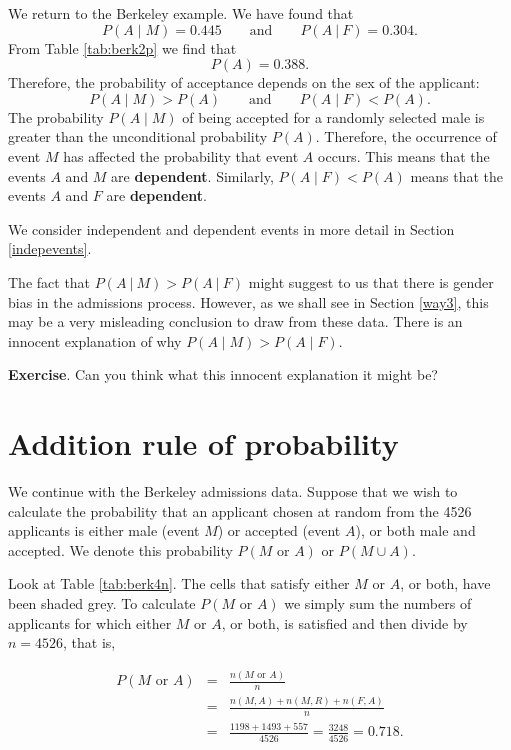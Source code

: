 \documentclass[
  british,
]{book}
\begin{document}
We return to the Berkeley example. We have found that
\[ P(A \mid M) = 0.445 \qquad \mbox{and} \qquad P(A~|~F) = 0.304. \]
From Table \ref{tab:berk2p} we find that
\[ P(A) = 0.388. \]
Therefore, the probability of acceptance depends on the sex of the applicant:
\[ P(A \mid M) > P(A) \qquad \mbox{and} \qquad P(A \mid F) < P(A). \]
The probability \(P(A \mid M)\) of being accepted for a randomly selected male is greater than the unconditional probability \(P(A)\). Therefore, the occurrence of event \(M\) has affected the probability that event \(A\) occurs. This means that the events \(A\) and \(M\) are \textbf{dependent}. Similarly, \(P(A \mid F) < P(A)\) means that the events \(A\) and \(F\) are \textbf{dependent}.

We consider independent and dependent events in more detail in Section \ref{indepevents}.

The fact that \(P(A~|~M) > P(A~|~F)\) might suggest to us that there is gender bias in the admissions process. However, as we shall see in Section \ref{way3}, this may be a very misleading conclusion to draw from these data. There is an innocent explanation of why \(P(A \mid M) > P(A \mid F)\).

\textbf{Exercise}. Can you think what this innocent explanation it might be?

\hypertarget{addition-rule-of-probability}{%
\section{Addition rule of probability}\label{addition-rule-of-probability}}

We continue with the Berkeley admissions data. Suppose that we wish to calculate the probability that an applicant chosen at random from the 4526 applicants is either male (event \(M\)) or accepted (event \(A\)), or both male and accepted. We denote this probability \(P(M \mbox{ or } A)\) or \(P(M \cup A)\).

Look at Table \ref{tab:berk4n}. The cells that satisfy either \(M\) or \(A\), or both, have been shaded grey. To calculate \(P(M \mbox{ or } A)\) we simply sum the numbers of applicants for which either \(M\) or \(A\), or both, is satisfied and then divide by \(n=4526\), that is,

\begin{eqnarray*}
P(M \mbox{ or } A) &=& \frac{n(M \mbox{ or } A)}{n} \\
          &=& \frac{n(M , A)+n(M , R)+n(F , A)}{n} \\
          &=& \frac{1198+1493+557}{4526} = \frac{3248}{4526} = 0.718. 
\end{eqnarray*}
\end{document}

